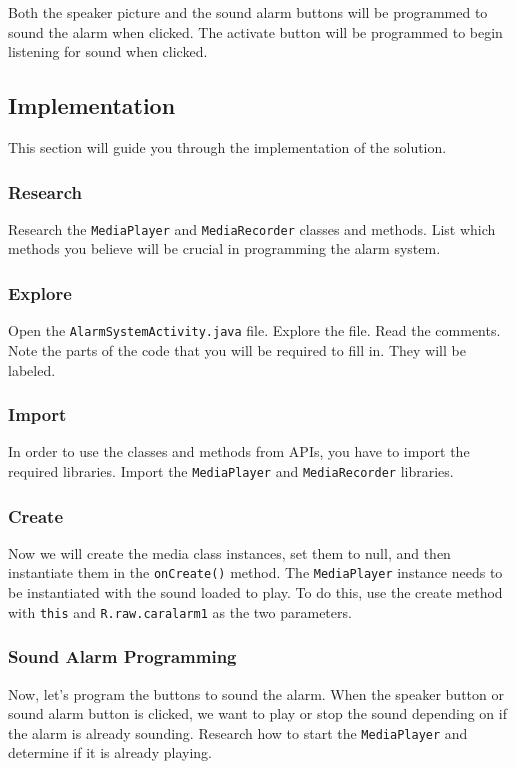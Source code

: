 Both the speaker picture and the sound alarm buttons will be programmed to sound the alarm when clicked. The activate button will be programmed to begin listening for sound when clicked.


\subsection{Implementation}
This section will guide you through the implementation of the solution.
\subsubsection{Research}
Research the \verb=MediaPlayer= and \verb=MediaRecorder= classes and methods. List which methods you believe will be crucial in programming the alarm system.

\subsubsection{Explore}
Open the \verb=AlarmSystemActivity.java= file. Explore the file. Read the comments. Note the parts of the code that you will be required to fill in. They will be labeled.

\subsubsection{Import}
In order to use the classes and methods from APIs, you have to import the required libraries. Import the \verb=MediaPlayer= and \verb=MediaRecorder= libraries.

\subsubsection{Create}
Now we will create the media class instances, set them to null, and then instantiate them in the \verb=onCreate()= method. The \verb=MediaPlayer= instance needs to be instantiated with the sound loaded to play. To do this, use the create method with \verb=this= and \verb=R.raw.caralarm1= as the two parameters.

\subsubsection{Sound Alarm Programming}
Now, let's program the buttons to sound the alarm. When the speaker button or sound alarm button is clicked, we want to play or stop the sound depending on if the alarm is already sounding. Research how to start the \verb=MediaPlayer= and determine if it is already playing.

